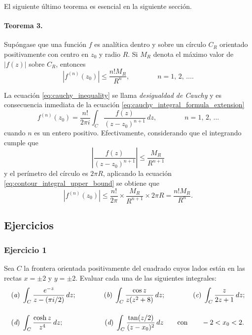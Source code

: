 \documentclass[a4paper]{report}
\begin{document}
El siguiente último teorema es esencial en la siguiente sección.

\paragraph{Teorema 3.} Supóngase que una función \(f\) es analítica dentro y sobre un círculo \(C_R\) orientado positivamente con centro en \(z_0\) y radio \(R\). Si \(M_R\) denota el máximo valor de \(|f(z)|\) sobre \(C_R\), entonces
\begin{equation}\label{eq:cauchy_inequality}
 |f^{(n)}(z_0)|\leq\frac{n!M_R}{R^n},
 \qquad\qquad 
 n=1,\,2,\,\dots. 
\end{equation}

La ecuación \ref{eq:cauchy_inequality} se llama \emph{desigualdad de Cauchy} y es consecuencia inmediata de la ecuación \ref{eq:cauchy_integral_formula_extension}
\[
 f^{(n)}(z_0)=\frac{n!}{2\pi i}\int_{C}\frac{f(z)}{(z-z_0)^{n+1}}\,dz,
 \qquad\qquad 
 n=1,\,2,\,\dots
\]
cuando \(n\) es un entero positivo. Efectivamente, considerando que el integrando cumple que 
\[
 \left|\frac{f(z)}{(z-z_0)^{n+1}}\right|\leq\frac{M_R}{R^{n+1}}
\]
y el perímetro del círculo es \(2\pi R\), aplicando la ecuación \ref{eq:contour_integral_upper_bound} se obtiene que 
\[
 \left|f^{(n)}(z_0)\right|\leq\frac{n!}{2\pi}\times\frac{M_R}{R^{n+1}}\times2\pi R=\frac{n!M_R}{R^n}.
\]

\subsection*{Ejercicios}

\subsubsection*{Ejercicio 1}

Sea \(C\) la frontera orientada positivamente del cuadrado cuyos lados están en las rectas \(x=\pm2\) y \(y=\pm2\). Evaluar cada una de las siguientes integrales:
\begin{align*}
 (\textit{a})\;&\int_C\frac{e^{-z}}{z-(\pi i/2)}\,dz;\qquad\qquad
 (\textit{b})\;\int_C\frac{\cos z}{z(z^2+8)}\,dz;\qquad\qquad
 (\textit{c})\;\int_C\frac{z}{2z+1}\,dz;\\[\bigskipamount]
 (\textit{d})\;&\int_C\frac{\cosh z}{z^4}\,dz;\qquad\qquad\qquad
 (\textit{d})\;\int_C\frac{\tan(z/2)}{(z-x_0)^2}\,dz\qquad\textrm{con}\qquad 
 -2<x_0<2.
\end{align*}
\end{document}
